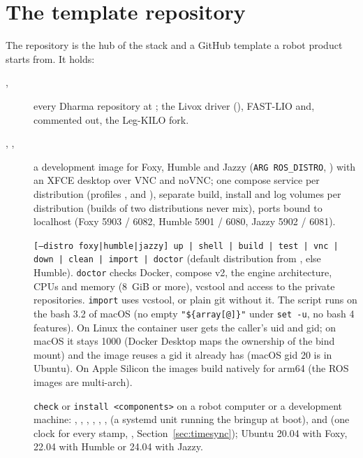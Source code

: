 \section{The template repository}
\label{sec:template}

The  repository is the hub of the stack and a GitHub template a robot product starts
from. It holds:
\begin{description}
  \item[, ] every Dharma repository at ; the
    Livox driver (), FAST-LIO and, commented out, the Leg-KILO fork.
  \item[, , ] a development image for
    Foxy, Humble and Jazzy (\texttt{ARG ROS\_DISTRO}, ) with an XFCE
    desktop over VNC and noVNC; one compose service per distribution (profiles ,
     and ), separate build, install and log volumes per distribution
    (builds of two distributions never mix), ports bound to localhost (Foxy 5903 / 6082, Humble
    5901 / 6080, Jazzy 5902 / 6081).
  \item[] \texttt{[--distro foxy|humble|jazzy] up | shell | build | test |
    vnc | down | clean | import | doctor} (default distribution from , else
    Humble). \texttt{doctor} checks Docker, compose v2, the engine architecture, CPUs and memory
    (8~GiB or more), vcstool and access to the private repositories. \texttt{import} uses
    vcstool, or plain git without it. The script runs on the bash 3.2 of macOS (no empty
    \texttt{"\$\{array[@]\}"} under \texttt{set -u}, no bash 4 features). On Linux the container
    user gets the caller's uid and gid; on macOS it stays 1000 (Docker Desktop maps the ownership
    of the bind mount) and the image reuses a gid it already has (macOS gid 20 is
     in Ubuntu). On Apple Silicon the images build natively for arm64 (the ROS
    images are multi-arch).
  \item[] \texttt{check} or \texttt{install <components>} on a robot
    computer or a development machine: , , , ,
    , ,  (a systemd unit running the bringup at boot),
     and  (one clock for every stamp, ,
    Section~\ref{sec:timesync}); Ubuntu 20.04 with Foxy, 22.04 with Humble or 24.04 with Jazzy.

\end{description}
